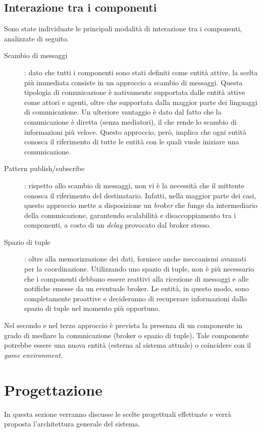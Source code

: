 \documentclass[a4paper,12pt]{article}
\begin{document}
\subsection{Interazione tra i componenti} \label{interactions}
Sono state individuate le principali modalità di interazione tra i componenti, analizzate di seguito.
\begin{description}
	\item[Scambio di messaggi]: dato che tutti i componenti sono stati definiti come entità attive, la scelta più immediata consiste in un approccio a scambio di messaggi. Questa tipologia di comunicazione è nativamente supportata dalle entità attive come attori e agenti, oltre che supportata dalla maggior parte dei linguaggi di comunicazione. Un ulteriore vantaggio è dato dal fatto che la comunicazione è diretta (senza mediatori), il che rende lo scambio di informazioni più veloce. Questo approccio, però, implica che ogni entità conosca il riferimento di tutte le entità con le quali vuole iniziare una comunicazione.
	\item[Pattern publish/subscribe]: rispetto allo scambio di messaggi, non vi è la necessità che il mittente conosca il riferimento del destinatario. Infatti, nella maggior parte dei casi, questo approccio mette a disposizione un \emph{broker} che funge da intermediario della comunicazione, garantendo scalabilità e disaccoppiamento tra i componenti, a costo di un \emph{delay} provocato dal broker stesso.
	\item[Spazio di tuple]: oltre alla memorizzazione dei dati, fornisce anche meccanismi avanzati per la coordinazione. Utilizzando uno spazio di tuple, non è più necessario che i componenti debbano essere reattivi alla ricezione di messaggi e alle notifiche emesse da un eventuale broker. Le entità, in questo modo, sono completamente proattive e decideranno di recuperare informazioni dallo spazio di tuple nel momento più opportuno.
\end{description}
Nel secondo e nel terzo approccio è prevista la presenza di un componente in grado di mediare la comunicazione (broker o spazio di tuple). Tale componente potrebbe essere una nuova entità (esterna al sistema attuale) o coincidere con il \emph{game environment}.

\section{Progettazione} \label{general-design}
In questa sezione verranno discusse le scelte progettuali effettuate e verrà proposta l'architettura generale del sistema.
\end{document}
